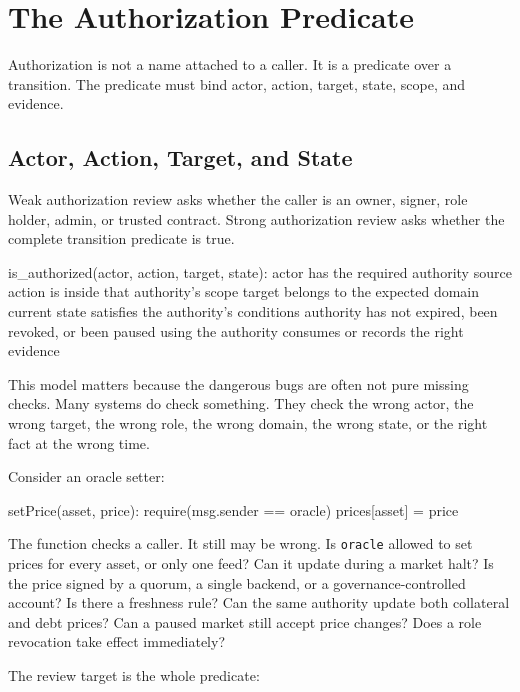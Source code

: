 \section{The Authorization Predicate}

Authorization is not a name attached to a caller. It is a predicate over a transition. The predicate must bind actor, action, target, state, scope, and evidence.

\subsection{Actor, Action, Target, and State}

Weak authorization review asks whether the caller is an owner, signer, role holder, admin, or trusted contract. Strong authorization review asks whether the complete transition predicate is true.

\begin{codeblock}
is_authorized(actor, action, target, state):
    actor has the required authority source
    action is inside that authority's scope
    target belongs to the expected domain
    current state satisfies the authority's conditions
    authority has not expired, been revoked, or been paused
    using the authority consumes or records the right evidence
\end{codeblock}

This model matters because the dangerous bugs are often not pure missing checks. Many systems do check something. They check the wrong actor, the wrong target, the wrong role, the wrong domain, the wrong state, or the right fact at the wrong time.

Consider an oracle setter:

\begin{codeblock}
setPrice(asset, price):
    require(msg.sender == oracle)
    prices[asset] = price
\end{codeblock}

The function checks a caller. It still may be wrong. Is \texttt{oracle} allowed to set prices for every asset, or only one feed? Can it update during a market halt? Is the price signed by a quorum, a single backend, or a governance-controlled account? Is there a freshness rule? Can the same authority update both collateral and debt prices? Can a paused market still accept price changes? Does a role revocation take effect immediately?

The review target is the whole predicate:

